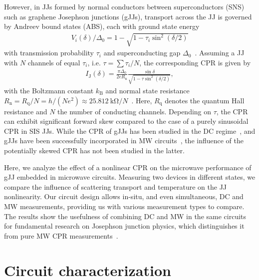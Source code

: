 However, in JJs formed by normal conductors between superconductors (SNS) such as graphene Josephson junctions (gJJs), transport across the JJ is governed by Andreev bound states (ABS), each with ground state energy
\begin{align}
V_i(\delta)/\Delta_0=1-\sqrt{1-\tau_i\sin^2(\delta/2)}
\label{CPReq:ABSenergy}
\end{align}
%
with transmission probability $\tau_i$ and superconducting gap $\Delta_0$~\cite{beenakkerUniversalLimitCriticalcurrent1991,titovJosephsonEffectBallistic2006b}.
%
Assuming a JJ with $N$ channels of equal $\tau_i$, i.e. $\tau=\sum\tau_i/N$, the corresponding CPR is given by
\begin{align}
I_\text{J}(\delta) = \frac{\pi\Delta_0}{2 e R_\text{n}} \frac{\sin\delta}{\sqrt{1 - \tau \sin^2(\delta / 2)}},
\label{CPReq:CPR-ball}
\end{align}
%
with the Boltzmann constant $k_\text{B}$ and normal state resistance $R_\text{n}= R_\text{q}/N = h/(Ne^2)\approx \SI{25.812}{\kilo\ohm} / N$~\cite{golubovCurrentphaseRelationJosephson2004a,leeUltimatelyShortBallistic2015}.
%
Here, $R_\text{q}$ denotes the quantum Hall resistance and $N$ the number of conducting channels.
%
Depending on $\tau$, the CPR can exhibit significant forward skew compared to the case of a purely sinusoidal CPR in SIS JJs.
%
While the CPR of gJJs has been studied in the DC regime~\cite{englishObservationNonsinusoidalCurrentphase2016,nandaCurrentPhaseRelationBallistic2017}, and gJJs have been successfully incorporated in MW circuits~\cite{schmidtBallisticGrapheneSuperconducting2018,krollMagneticFieldCompatible2018,wangCoherentControlHybrid2019}, the influence of the potentially skewed CPR has not been studied in the latter.

Here, we analyze the effect of a nonlinear CPR on the microwave performance of gJJ embedded in microwave circuits.
%
Measuring two devices in different states, we compare the influence of scattering transport and temperature on the JJ nonlinearity.
%
Our circuit design allows in-situ, and even simultaneous, DC and MW measurements, providing us with various measurement types to compare.
%
The results show the usefulness of combining DC and MW in the same circuits for fundamental research on Josephson junction physics, which distinguishes it from pure MW CPR measurements~\cite{rifkinCurrentphaseRelationPhasedependent1976}.

\section{Circuit characterization}

